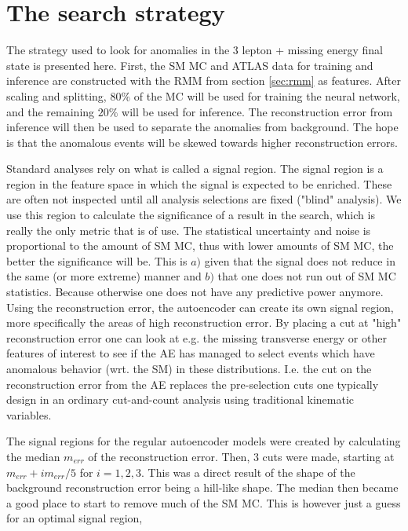\section{The search strategy}\label{sec:strategy}
The strategy used to look for anomalies in the 3 lepton + missing energy final state is presented here. 
First, the SM MC and ATLAS data for training and inference are constructed with the RMM from section 
\ref{sec:rmm} as features. After scaling and splitting, $80\%$ of the MC will be used for training the neural 
network, and the remaining $20\%$ will be used for inference. The reconstruction error 
from inference will then be used to separate the anomalies from background. The hope is that the anomalous events will 
be skewed towards higher reconstruction errors.\par
Standard analyses rely on what is called a signal region. The signal region is a region in the feature space in which
the signal is expected to be enriched. These are often not inspected until all analysis selections are fixed ("blind" analysis). 
We use this region to calculate the significance of a result in the search, which is 
really the only metric that is of use. 
The statistical uncertainty and noise is proportional to the amount of SM MC, 
thus with lower amounts of SM MC, the better the significance will be. This is $a)$ 
given that the signal does not reduce in the same (or more extreme) manner  and $b)$ 
that one does not run out of SM MC statistics. Because otherwise one does not have any predictive power anymore.
Using the reconstruction error, the autoencoder 
can create its own signal region, more specifically the areas of high reconstruction error. 
By placing a cut at "high" reconstruction error one can look at e.g. the missing transverse energy or other 
features of interest to see if the AE has managed to select events which have anomalous behavior (wrt. the SM) 
in these distributions. I.e. the cut on the reconstruction error from the AE replaces the pre-selection cuts one 
typically design in an ordinary cut-and-count analysis using traditional kinematic variables.\par 
The signal regions for the regular autoencoder models were created by calculating the median $m_{err}$ of the 
reconstruction error. Then, 3 cuts were made, starting at $m_{err} + im_{err}/5$ for $i = 1,2,3$. This was a direct 
result of the shape of the background reconstruction error being a hill-like shape. The median then became a 
good place to start to remove much of the SM MC. This is however just a guess for an optimal signal region, 
